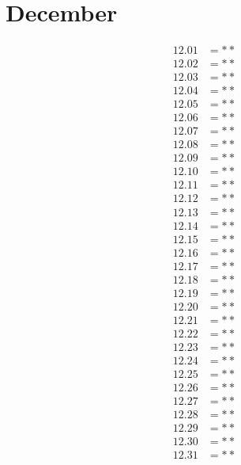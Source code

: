 \documentclass[12pt]{article}
\begin{document}
\section{December}
\begin{align*}
12.01 &= **\\
12.02 &= **\\
12.03 &= **\\
12.04 &= **\\
12.05 &= **\\
12.06 &= **\\
12.07 &= **\\
12.08 &= **\\
12.09 &= **\\
12.10 &= **\\
12.11 &= **\\
12.12 &= **\\
12.13 &= **\\
12.14 &= **\\
12.15 &= **\\
12.16 &= **\\
12.17 &= **\\
12.18 &= **\\
12.19 &= **\\
12.20 &= **\\
12.21 &= **\\
12.22 &= **\\
12.23 &= **\\
12.24 &= **\\
12.25 &= **\\
12.26 &= **\\
12.27 &= **\\
12.28 &= **\\
12.29 &= **\\
12.30 &= **\\
12.31 &= **\\
\end{align*}
\end{document}
